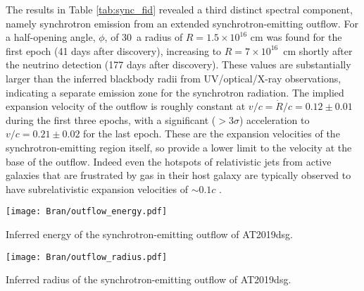 The results in Table \ref{tab:sync_fid} revealed a third distinct spectral component, namely synchrotron emission from an extended synchrotron-emitting outflow. For a half-opening angle, $\phi$, of 30\arcdeg\ a radius of $R = 1.5 \times 10^{16}$ cm was found for the first epoch (41 days after discovery), increasing to $R = 7 \times 10^{16}$~cm shortly after the neutrino detection (177 days after discovery). These values are substantially larger than the inferred blackbody radii from UV/optical/X-ray observations, indicating a separate emission zone for the synchrotron radiation. The implied expansion velocity of the outflow is roughly constant at $v/c = \dot{R}/c = 0.12 \pm 0.01 $ during the first three epochs, with a significant ($>3\sigma$) acceleration to $v/c = 0.21 \pm0.02$ for the last epoch. These are the expansion velocities of the synchrotron-emitting region itself, so provide a lower limit to the velocity at the base of the outflow.  Indeed even the hotspots of relativistic jets from active galaxies that are frustrated by gas in their host galaxy are typically observed to have subrelativistic expansion velocities of $\sim0.1c$ . 

\begin{marginfigure}
	\texttt{[image: Bran/outflow\_energy.pdf]}
	\caption{Inferred energy of the synchrotron-emitting outflow of AT2019dsg.}
	\label{fig:bran_energy}
\end{marginfigure}

\begin{marginfigure}
	\texttt{[image: Bran/outflow\_radius.pdf]}
	\caption{Inferred radius of the synchrotron-emitting outflow of AT2019dsg.}
	\label{fig:bran_radius}
\end{marginfigure}

